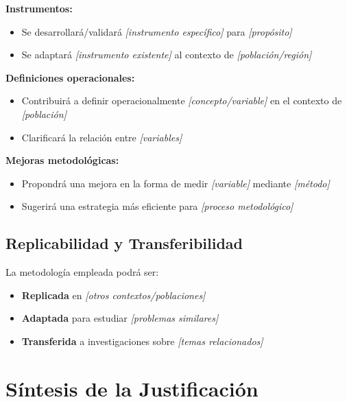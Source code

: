 \textbf{Instrumentos:}

\begin{itemize}
    \item Se desarrollará/validará \textit{[instrumento específico]} para \textit{[propósito]}
    \item Se adaptará \textit{[instrumento existente]} al contexto de \textit{[población/región]}
\end{itemize}

\textbf{Definiciones operacionales:}

\begin{itemize}
    \item Contribuirá a definir operacionalmente \textit{[concepto/variable]} en el contexto de \textit{[población]}
    \item Clarificará la relación entre \textit{[variables]}
\end{itemize}

\textbf{Mejoras metodológicas:}

\begin{itemize}
    \item Propondrá una mejora en la forma de medir \textit{[variable]} mediante \textit{[método]}
    \item Sugerirá una estrategia más eficiente para \textit{[proceso metodológico]}
\end{itemize}

\subsection{Replicabilidad y Transferibilidad}

La metodología empleada podrá ser:

\begin{itemize}
    \item \textbf{Replicada} en \textit{[otros contextos/poblaciones]}
    \item \textbf{Adaptada} para estudiar \textit{[problemas similares]}
    \item \textbf{Transferida} a investigaciones sobre \textit{[temas relacionados]}
\end{itemize}

\section{Síntesis de la Justificación}
\label{sec:sintesis_justificacion}

